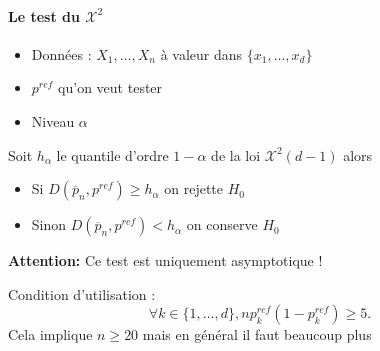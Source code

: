 \documentclass{article}
\theoremstyle{plain}%
\theoremstyle{definition}
\theoremstyle{remark}
\begin{document}
\paragraph{Le test du $ \mathcal{X}^2 $} 
\begin{itemize}
    \item Données : $ X_1, \dots, X_n $ à valeur dans $ \{x_1, \dots, x_d\} $ 
    \item $p^{ref} $ qu'on veut tester 
    \item Niveau $ \alpha  $ 
\end{itemize}
Soit $ h_\alpha  $ le quantile d'ordre $ 1-\alpha  $ de la loi $ \mathcal{X}^2 (d-1) $ alors 
\begin{itemize}
    \item Si $ D(\overline{p}_n, p^{ref}) \geq h_\alpha  $ on rejette $ H_0 $ 
    \item Sinon $  D(\overline{p}_n, p^{ref}) < h_\alpha $ on conserve $ H_0 $ 
\end{itemize}
\textbf{Attention:} Ce test est uniquement asymptotique ! 

Condition d'utilisation : 
\[
    \forall k \in \{1, \dots, d\}, np_k^{ref}(1-p_k^{ref}) \geq 5
.\]
Cela implique $ n \geq 20 $ mais en général il faut beaucoup plus 
\end{document}
